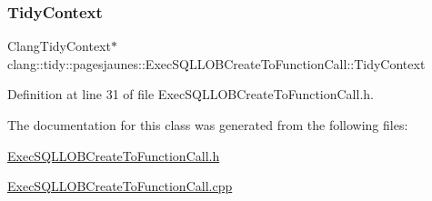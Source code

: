 \subsubsection{\texorpdfstring{Tidy\+Context}{TidyContext}}
{\footnotesize\ttfamily Clang\+Tidy\+Context$\ast$ clang\+::tidy\+::pagesjaunes\+::\+Exec\+S\+Q\+L\+L\+O\+B\+Create\+To\+Function\+Call\+::\+Tidy\+Context}



Definition at line 31 of file Exec\+S\+Q\+L\+L\+O\+B\+Create\+To\+Function\+Call.\+h.



The documentation for this class was generated from the following files\+:\begin{DoxyCompactItemize}
\item 
\hyperlink{_exec_s_q_l_l_o_b_create_to_function_call_8h}{Exec\+S\+Q\+L\+L\+O\+B\+Create\+To\+Function\+Call.\+h}\item 
\hyperlink{_exec_s_q_l_l_o_b_create_to_function_call_8cpp}{Exec\+S\+Q\+L\+L\+O\+B\+Create\+To\+Function\+Call.\+cpp}\end{DoxyCompactItemize}

